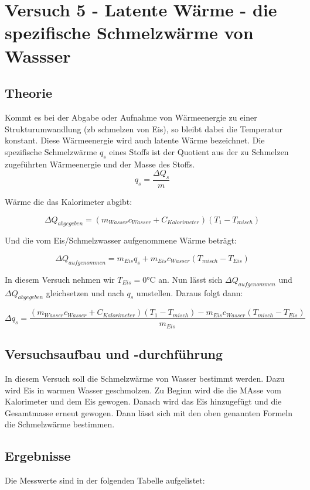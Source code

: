 \section{Versuch 5 - Latente Wärme - die spezifische Schmelzwärme von Wassser}
    \subsection{Theorie}
    Kommt es bei der Abgabe oder Aufnahme von Wärmeenergie zu einer Strukturumwandlung (zb schmelzen von Eis), so bleibt dabei die Temperatur konstant. Diese Wärmeenergie wird auch latente Wärme bezeichnet. Die spezifische Schmelzwärme $q_s$ eines Stoffs ist der Quotient aus der zu Schmelzen zugeführten Wärmeenergie und der Masse des Stoffs. 
    $$q_s = \frac{\Delta Q_s}{m}$$
    
    Wärme die das Kalorimeter abgibt:
    
    $$\Delta Q_{abgegeben} = (m_{Wasser}c_{Wasser} + C_{Kalorimeter}) (T_1 - T_{misch})$$
    
    Und die vom Eis/Schmelzwasser aufgenommene Wärme beträgt:
    
    $$\Delta Q_{aufgenommen} = m_{Eis}q_s + m_{Eis} c_{Wasser}(T_{misch} - T_{Eis})$$
    
    In diesem Versuch nehmen wir $T_{Eis} = 0 \text{°C}$ an. Nun lässt sich $\Delta Q_{aufgenommen}$ und $\Delta Q_{abgegeben} $ gleichsetzen und nach $q_s$ umstellen. Daraus folgt dann: 
    
    $$\Delta q_s = \frac{(m_{Wasser}c_{Wasser} + C_{Kalorimeter}) (T_1 - T_{misch}) - m_{Eis} c_{Wasser}(T_{misch} - T_{Eis})}{m_{Eis}}$$
    \subsection{Versuchsaufbau und -durchführung}
     In diesem Versuch soll die Schmelzwärme von Wasser bestimmt werden. Dazu wird Eis in warmen Wasser geschmolzen. Zu Beginn wird die die MAsse vom Kalorimeter und dem Eis gewogen. Danach wird das Eis hinzugefügt und die Gesamtmasse erneut gewogen.
     Dann lässt sich mit den oben genannten Formeln die Schmelzwärme bestimmen.

    
    \subsection{Ergebnisse}

        Die Messwerte sind in der folgenden Tabelle aufgelistet:

